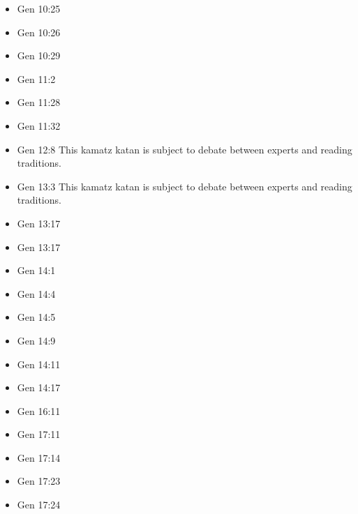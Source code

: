 \documentclass[14pt]{article}
\begin{document}
\begin{multicols}{2}
\begin{itemize}
\item Gen 10:25

\item Gen 10:26

\item Gen 10:29

\item Gen 11:2

\item Gen 11:28

\item Gen 11:32

\item Gen 12:8 This kamatz katan is subject to debate between experts and reading traditions.

\item Gen 13:3 This kamatz katan is subject to debate between experts and reading traditions.

\item Gen 13:17

\item Gen 13:17

\item Gen 14:1

\item Gen 14:4

\item Gen 14:5

\item Gen 14:9

\item Gen 14:11

\item Gen 14:17

\item Gen 16:11

\item Gen 17:11

\item Gen 17:14

\item Gen 17:23

\item Gen 17:24


\end{itemize}
\end{multicols}
\end{document}
